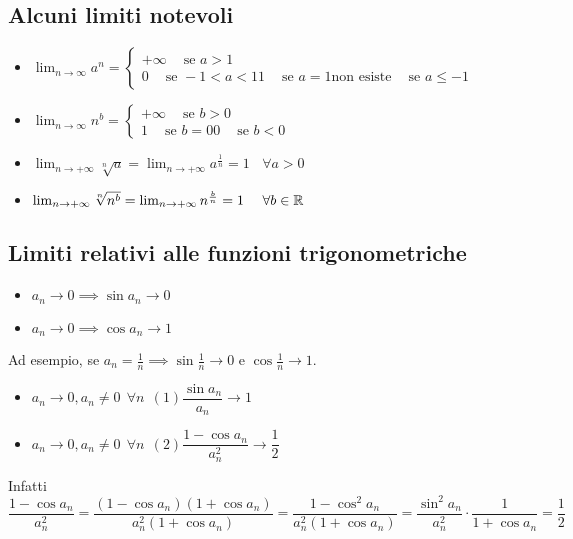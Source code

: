 \subsection{Alcuni limiti notevoli}
\begin{itemize}
    \item $\lim_{n\to\infty}a^n = \begin{cases}
                  +\infty \ \ \ \ \text{ se } a > 1 \\
                  0 \ \ \ \ \text{ se } -1 < a < 1
                  1 \ \ \ \ \text{ se } a = 1
                  \text{non esiste} \ \ \ \ \text{ se } a \leq -1
              \end{cases}$
    \item $\lim_{n\to\infty}n^b = \begin{cases}
                  +\infty \ \ \ \ \text{ se } b > 0 \\
                  1 \ \ \ \ \text{ se } b = 0
                  0 \ \ \ \ \text{ se } b < 0
              \end{cases}$
    \item $\lim_{n\to+\infty}\sqrt[n]{a} = \lim_{n\to+\infty}a^{\frac{1}{n}} = 1 \ \ \ \ \forall a > 0$
    \item $\lim_{n\to+\infty}\sqrt[n]{n^b} = \lim_{n\to+\infty}n^{\frac{b}{n}} = 1 \ \ \ \ \forall b \in \mathbb{R}$
\end{itemize}

\subsection{Limiti relativi alle funzioni trigonometriche}
\begin{itemize}
    \item $a_n\to0 \implies \sin a_n \to 0$
    \item $a_n\to0 \implies \cos a_n \to 1$
\end{itemize}
Ad esempio, se $a_n = \frac{1}{n} \implies \sin\frac{1}{n} \to 0$ e $\cos\frac{1}{n} \to 1$.
\begin{itemize}
    \item $a_n\to0, a_n\ne0 \ \ \forall n \ \ (1) \dfrac{\sin a_n}{a_n} \to 1$
    \item $a_n\to0, a_n\ne0 \ \ \forall n \ \ (2) \dfrac{1-\cos a_n}{a_n^2} \to \dfrac{1}{2}$
\end{itemize}
Infatti $\dfrac{1-\cos a_n}{a_n^2} = \dfrac{(1-\cos a_n)(1+\cos a_n)}{a_n^2(1+\cos a_n)} = \dfrac{1-\cos^2 a_n}{a_n^2(1+\cos a_n)} = \dfrac{\sin^2 a_n}{a_n^2}\cdot \dfrac{1}{1+\cos a_n} = \dfrac{1}{2}$

